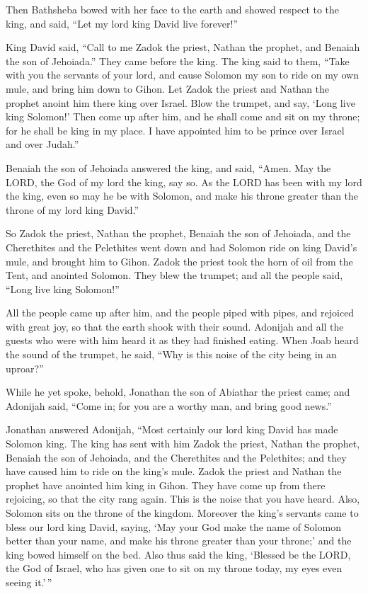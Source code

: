  Then Bathsheba bowed with her face to the earth and
showed respect to the king, and said, ``Let my lord king David live
forever!''

 King David said, ``Call to me Zadok the priest, Nathan
the prophet, and Benaiah the son of Jehoiada.'' They came before the
king.  The king said to them, ``Take with you the
servants of your lord, and cause Solomon my son to ride on my own mule,
and bring him down to Gihon.  Let Zadok the priest and
Nathan the prophet anoint him there king over Israel. Blow the trumpet,
and say, `Long live king Solomon!'  Then come up after
him, and he shall come and sit on my throne; for he shall be king in my
place. I have appointed him to be prince over Israel and over Judah.''

 Benaiah the son of Jehoiada answered the king, and said,
``Amen. May the LORD, the God of my lord the king, say so.
 As the LORD has been with my lord the king, even so may
he be with Solomon, and make his throne greater than the throne of my
lord king David.''

 So Zadok the priest, Nathan the prophet, Benaiah the son
of Jehoiada, and the Cherethites and the Pelethites went down and had
Solomon ride on king David's mule, and brought him to Gihon.
 Zadok the priest took the horn of oil from the Tent, and
anointed Solomon. They blew the trumpet; and all the people said, ``Long
live king Solomon!''

 All the people came up after him, and the people piped
with pipes, and rejoiced with great joy, so that the earth shook with
their sound.  Adonijah and all the guests who were with
him heard it as they had finished eating. When Joab heard the sound of
the trumpet, he said, ``Why is this noise of the city being in an
uproar?''

 While he yet spoke, behold, Jonathan the son of Abiathar
the priest came; and Adonijah said, ``Come in; for you are a worthy man,
and bring good news.''

 Jonathan answered Adonijah, ``Most certainly our lord
king David has made Solomon king.  The king has sent with
him Zadok the priest, Nathan the prophet, Benaiah the son of Jehoiada,
and the Cherethites and the Pelethites; and they have caused him to ride
on the king's mule.  Zadok the priest and Nathan the
prophet have anointed him king in Gihon. They have come up from there
rejoicing, so that the city rang again. This is the noise that you have
heard.  Also, Solomon sits on the throne of the kingdom.
 Moreover the king's servants came to bless our lord king
David, saying, `May your God make the name of Solomon better than your
name, and make his throne greater than your throne;' and the king bowed
himself on the bed.  Also thus said the king, `Blessed be
the LORD, the God of Israel, who has given one to sit on my throne
today, my eyes even seeing it.'\,''

